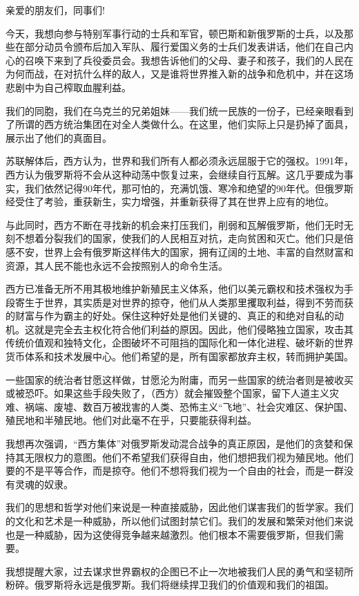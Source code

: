 \documentclass[UTF8, 11pt, oneside]{ctexart}
\begin{document}
亲爱的朋友们，同事们!

今天，我想向参与特别军事行动的士兵和军官，顿巴斯和新俄罗斯的士兵，以及那些在部分动员令颁布后加入军队、履行爱国义务的士兵们发表讲话，他们在自己内心的召唤下来到了兵役委员会。我想告诉他们的父母、妻子和孩子，我们的人民在为何而战，在对抗什么样的敌人，又是谁将世界推入新的战争和危机中，并在这场悲剧中为自己榨取血腥利益。

我们的同胞，我们在乌克兰的兄弟姐妹——我们统一民族的一份子，已经亲眼看到了所谓的西方统治集团在对全人类做什么。在这里，他们实际上只是扔掉了面具，展示出了他们的真面目。

苏联解体后，西方认为，世界和我们所有人都必须永远屈服于它的强权。1991年，西方认为俄罗斯将不会从这种动荡中恢复过来，会继续自行瓦解。这几乎要成为事实，我们依然记得90年代，那可怕的，充满饥饿、寒冷和绝望的90年代。但俄罗斯经受住了考验，重获新生，实力增强，并重新获得了其在世界上应有的地位。

与此同时，西方不断在寻找新的机会来打压我们，削弱和瓦解俄罗斯，他们无时无刻不想着分裂我们的国家，使我们的人民相互对抗，走向贫困和灭亡。他们只是倍感不安，世界上会有俄罗斯这样伟大的国家，拥有辽阔的土地、丰富的自然财富和资源，其人民不能也永远不会按照别人的命令生活。

西方已准备无所不用其极地维护新殖民主义体系，他们以美元霸权和技术强权为手段寄生于世界，其实质是对世界的掠夺，他们从人类那里攫取利益，得到不劳而获的财富与作为霸主的好处。保住这种好处是他们关键的、真正的和绝对自私的动机。这就是完全去主权化符合他们利益的原因。因此，他们侵略独立国家，攻击其传统价值观和独特文化，企图破坏不可阻挡的国际化和一体化进程、破坏新的世界货币体系和技术发展中心。他们希望的是，所有国家都放弃主权，转而拥护美国。

一些国家的统治者甘愿这样做，甘愿沦为附庸，而另一些国家的统治者则是被收买或被恐吓。如果这些手段失败了，（西方）就会摧毁整个国家，留下人道主义灾难、祸端、废墟、数百万被戕害的人类、恐怖主义“飞地”、社会灾难区、保护国、殖民地和半殖民地。他们对此毫不在乎，只要能获得利益。

我想再次强调，“西方集体”对俄罗斯发动混合战争的真正原因，是他们的贪婪和保持其无限权力的意图。他们不希望我们获得自由，他们想把我们视为殖民地。他们要的不是平等合作，而是掠夺。他们不想将我们视为一个自由的社会，而是一群没有灵魂的奴隶。

我们的思想和哲学对他们来说是一种直接威胁，因此他们谋害我们的哲学家。我们的文化和艺术是一种威胁，所以他们试图封禁它们。我们的发展和繁荣对他们来说也是一种威胁，因为这使得竞争越来越激烈。他们根本不需要俄罗斯，但我们需要。

我想提醒大家，过去谋求世界霸权的企图已不止一次地被我们人民的勇气和坚韧所粉碎。俄罗斯将永远是俄罗斯。我们将继续捍卫我们的价值观和我们的祖国。
\end{document}
